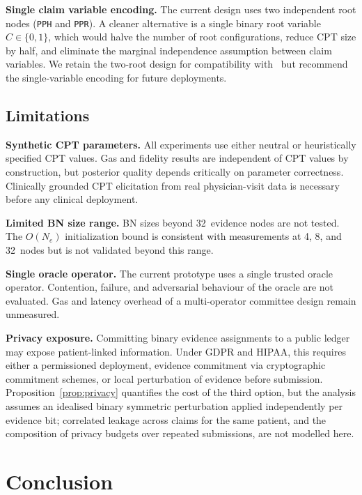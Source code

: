 \documentclass[journal]{IEEEtran}
\theoremstyle{definition}
\theoremstyle{remark}
\begin{document}
\textbf{Single claim variable encoding.}
The current design uses two independent root nodes
(\texttt{PPH} and \texttt{PPR}). A cleaner
alternative is a single binary root variable
$C\in\{0,1\}$, which would halve the number of root
configurations, reduce CPT size by half, and
eliminate the marginal independence assumption between
claim variables. We retain the two-root design for
compatibility with~\cite{naeem2025evidence} but recommend the
single-variable encoding for future deployments.

\subsection{Limitations}
\label{sec:limitations}

\textbf{Synthetic CPT parameters.}
All experiments use either neutral or heuristically
specified CPT values. Gas and fidelity results are
independent of CPT values by construction, but
posterior quality depends critically on parameter
correctness. Clinically grounded CPT elicitation from
real physician-visit data is necessary before any
clinical deployment.

\textbf{Limited BN size range.}
BN sizes beyond 32~evidence nodes are not tested. The
$O(N_e)$ initialization bound is consistent with
measurements at 4, 8, and 32~nodes but is not
validated beyond this range.

\textbf{Single oracle operator.}
The current prototype uses a single trusted oracle
operator. Contention, failure, and adversarial
behaviour of the oracle are not evaluated. Gas and
latency overhead of a multi-operator committee design
remain unmeasured.

\textbf{Privacy exposure.}
Committing binary evidence assignments to a public ledger
may expose patient-linked information. Under GDPR and
HIPAA, this requires either a permissioned deployment,
evidence commitment via cryptographic commitment schemes,
or local perturbation of evidence before submission.
Proposition~\ref{prop:privacy} quantifies the cost of the
third option, but the analysis assumes an idealised binary
symmetric perturbation applied independently per evidence
bit; correlated leakage across claims for the same patient,
and the composition of privacy budgets over repeated
submissions, are not modelled here.


\section{Conclusion}
\label{sec:conclusion}
\end{document}
